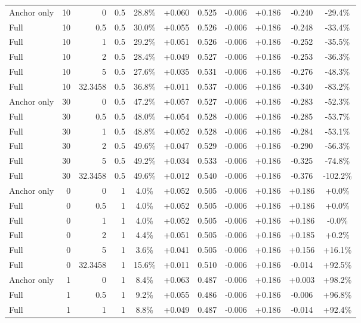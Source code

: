 \begin{table}[htbp]
\begin{tabular}{lrrrccccccc}
Anchor only & 10 & 0 & 0.5 & 28.8\% & +0.060 & 0.525 & -0.006 & +0.186 & -0.240 & -29.4\% \\
Full & 10 & 0.5 & 0.5 & 30.0\% & +0.055 & 0.526 & -0.006 & +0.186 & -0.248 & -33.4\% \\
Full & 10 & 1 & 0.5 & 29.2\% & +0.051 & 0.526 & -0.006 & +0.186 & -0.252 & -35.5\% \\
Full & 10 & 2 & 0.5 & 28.4\% & +0.049 & 0.527 & -0.006 & +0.186 & -0.253 & -36.3\% \\
Full & 10 & 5 & 0.5 & 27.6\% & +0.035 & 0.531 & -0.006 & +0.186 & -0.276 & -48.3\% \\
Full & 10 & 32.3458 & 0.5 & 36.8\% & +0.011 & 0.537 & -0.006 & +0.186 & -0.340 & -83.2\% \\
Anchor only & 30 & 0 & 0.5 & 47.2\% & +0.057 & 0.527 & -0.006 & +0.186 & -0.283 & -52.3\% \\
Full & 30 & 0.5 & 0.5 & 48.0\% & +0.054 & 0.528 & -0.006 & +0.186 & -0.285 & -53.7\% \\
Full & 30 & 1 & 0.5 & 48.8\% & +0.052 & 0.528 & -0.006 & +0.186 & -0.284 & -53.1\% \\
Full & 30 & 2 & 0.5 & 49.6\% & +0.047 & 0.529 & -0.006 & +0.186 & -0.290 & -56.3\% \\
Full & 30 & 5 & 0.5 & 49.2\% & +0.034 & 0.533 & -0.006 & +0.186 & -0.325 & -74.8\% \\
Full & 30 & 32.3458 & 0.5 & 49.6\% & +0.012 & 0.540 & -0.006 & +0.186 & -0.376 & -102.2\% \\
Anchor only & 0 & 0 & 1 & 4.0\% & +0.052 & 0.505 & -0.006 & +0.186 & +0.186 & +0.0\% \\
Full & 0 & 0.5 & 1 & 4.0\% & +0.052 & 0.505 & -0.006 & +0.186 & +0.186 & +0.0\% \\
Full & 0 & 1 & 1 & 4.0\% & +0.052 & 0.505 & -0.006 & +0.186 & +0.186 & -0.0\% \\
Full & 0 & 2 & 1 & 4.4\% & +0.051 & 0.505 & -0.006 & +0.186 & +0.185 & +0.2\% \\
Full & 0 & 5 & 1 & 3.6\% & +0.041 & 0.505 & -0.006 & +0.186 & +0.156 & +16.1\% \\
Full & 0 & 32.3458 & 1 & 15.6\% & +0.011 & 0.510 & -0.006 & +0.186 & -0.014 & +92.5\% \\
Anchor only & 1 & 0 & 1 & 8.4\% & +0.063 & 0.487 & -0.006 & +0.186 & +0.003 & +98.2\% \\
Full & 1 & 0.5 & 1 & 9.2\% & +0.055 & 0.486 & -0.006 & +0.186 & -0.006 & +96.8\% \\
Full & 1 & 1 & 1 & 8.8\% & +0.049 & 0.487 & -0.006 & +0.186 & -0.014 & +92.4\% \\

\end{tabular}
\end{table}
